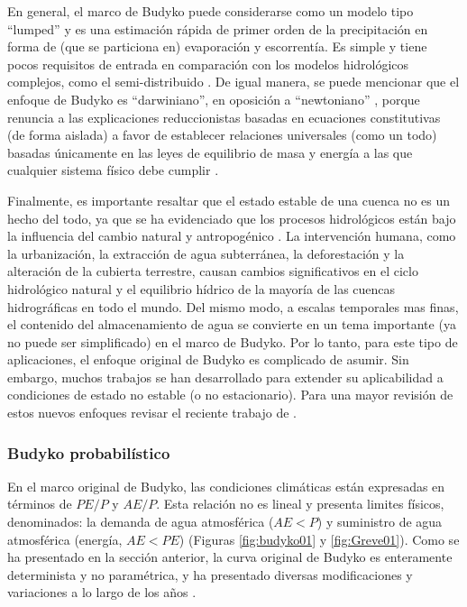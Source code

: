 \documentclass[12pt]{article}
\begin{document}
\vspace*{.5cm}


En general, el marco de Budyko puede considerarse como un modelo tipo “lumped” y es una estimación rápida de primer orden de la precipitación en forma de (que se particiona en) evaporación y escorrentía. Es simple y tiene pocos requisitos de entrada en comparación con los modelos hidrológicos complejos, como el semi-distribuido \citep{mianabadi2020budyko}. De igual manera, se puede mencionar que el enfoque de Budyko es “darwiniano”, en oposición a “newtoniano” \citep{wang2016advances}, porque renuncia a las explicaciones reduccionistas basadas en ecuaciones constitutivas (de forma aislada) a favor de establecer relaciones universales (como un todo) basadas únicamente en las leyes de equilibrio de masa y energía a las que cualquier sistema físico debe cumplir \citep{sposito2017understanding}.

Finalmente, es importante resaltar que el estado estable de una cuenca no es un hecho del todo, ya que se ha evidenciado que los procesos hidrológicos están bajo la influencia del cambio natural y antropogénico \citep{greve2016two,moussa2016budyko,fathi2019new}. La intervención humana, como la urbanización, la extracción de agua subterránea, la deforestación y la alteración de la cubierta terrestre, causan cambios significativos en el ciclo hidrológico natural y el equilibrio hídrico de la mayoría de las cuencas hidrográficas en todo el mundo. Del mismo modo, a escalas temporales mas finas, el contenido del almacenamiento de agua se convierte en un tema importante (ya no puede ser simplificado) en el marco de Budyko. Por lo tanto, para este tipo de aplicaciones, el enfoque original de Budyko es complicado de asumir. Sin embargo, muchos trabajos se han desarrollado para extender su aplicabilidad a condiciones de estado no estable (o no estacionario). Para una mayor revisión de estos nuevos enfoques revisar el reciente trabajo de \citet{mianabadi2020budyko}.

\subsubsection{Budyko probabilístico}

En el marco original de Budyko, las condiciones climáticas están expresadas en términos de $PE/P$ y $AE/P$. Esta relación no es lineal y presenta limites físicos, denominados: la demanda de agua atmosférica ($AE < P$) y suministro de agua atmosférica (energía, $AE < PE$) (Figuras \ref{fig:budyko01} y \ref{fig:Greve01}). Como se ha presentado en la sección anterior, la curva original de Budyko es enteramente determinista y no paramétrica, y ha presentado diversas modificaciones y variaciones a lo largo de los años \citep{Budyko1961,Fu1981,Koster1999,Wang2014,Zhang2004,Zhang2008,fathi2019new}. 
\end{document}
